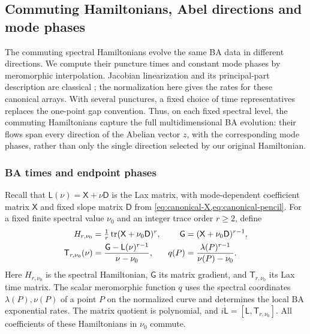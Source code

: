 \subsection{Commuting Hamiltonians, Abel directions and mode phases}
\label{sec:BA-higher-flows}

The commuting spectral Hamiltonians evolve the same BA data in
different directions. We compute their puncture times and constant
mode phases by meromorphic interpolation. Jacobian linearization
and its principal-part description are classical
\cite{Griffiths1985,Beauville1990,AdamsHarnadHurtubise1993}; the normalization here gives the
rates for these canonical arrays. With several punctures, a fixed
choice of time representatives replaces the one-point gap convention.
Thus, on each fixed spectral level, the commuting Hamiltonians capture
the full multidimensional BA evolution: their flows span every
direction of the Abelian vector $z$, with the corresponding mode
phases, rather than only the single direction selected by our original
Hamiltonian.

\subsubsection{BA times and endpoint phases}

Recall that $\mathsf L(\nu)=\mathsf X+\nu\mathsf D$ is the Lax
matrix, with mode-dependent coefficient matrix $\mathsf X$ and fixed
slope matrix $\mathsf D$ from \cref{eq:canonical-X,eq:canonical-pencil}.
For a fixed finite spectral value $\nu_0$ and an integer trace order
$r\geq2$, define
\begin{equation}\label{eq:BA-shifted-flow}
\begin{aligned}
 H_{r,\nu_0}&=\tfrac1r\operatorname{tr}(\mathsf X+\nu_0\mathsf D)^r,&
 \mathsf G&=(\mathsf X+\nu_0\mathsf D)^{r-1},\\
 \mathsf T_{r,\nu_0}(\nu)&=
 \frac{\mathsf G-\mathsf L(\nu)^{r-1}}{\nu-\nu_0},&
 q(P)&=\frac{\lambda(P)^{r-1}}{\nu(P)-\nu_0}.
\end{aligned}
\end{equation}
Here $H_{r,\nu_0}$ is the spectral Hamiltonian, $\mathsf G$ its matrix
gradient, and $\mathsf T_{r,\nu_0}$ its Lax time matrix.
The scalar meromorphic function $q$ uses the spectral coordinates
$\lambda(P),\nu(P)$ of a point $P$ on the normalized curve and
determines the local BA exponential rates.
The matrix quotient is polynomial, and
$i\dot{\mathsf L}=[\mathsf L,\mathsf T_{r,\nu_0}]$.
All coefficients of these Hamiltonians in $\nu_0$ commute.

